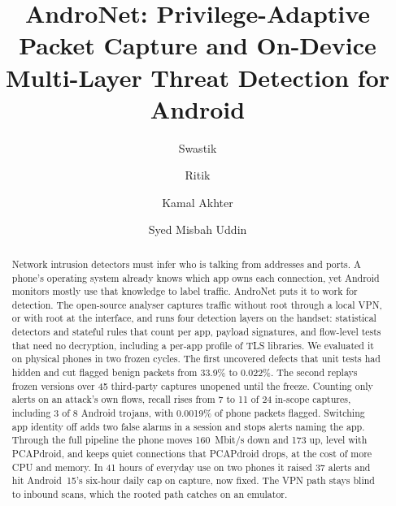 \documentclass[runningheads]{llncs}
\newcommand{\Envelope}{\ding{41}}
\begin{document}
\title{AndroNet: Privilege-Adaptive Packet Capture and On-Device Multi-Layer Threat Detection for Android}

\author{Swastik\Envelope \and
Ritik \and
Kamal Akhter \and
Syed Misbah Uddin}


\maketitle

\begin{abstract}
Network intrusion detectors must infer who is talking from addresses and ports. A phone's operating system already knows which app owns each connection, yet Android monitors mostly use that knowledge to label traffic. AndroNet puts it to work for detection. The open-source analyser captures traffic without root through a local VPN, or with root at the interface, and runs four detection layers on the handset: statistical detectors and stateful rules that count per app, payload signatures, and flow-level tests that need no decryption, including a per-app profile of TLS libraries. We evaluated it on physical phones in two frozen cycles. The first uncovered defects that unit tests had hidden and cut flagged benign packets from 33.9\% to 0.022\%. The second replays frozen versions over 45 third-party captures unopened until the freeze. Counting only alerts on an attack's own flows, recall rises from 7 to 11 of 24 in-scope captures, including 3 of 8 Android trojans, with 0.0019\% of phone packets flagged. Switching app identity off adds two false alarms in a session and stops alerts naming the app. Through the full pipeline the phone moves 160~Mbit/s down and 173 up, level with PCAPdroid, and keeps quiet connections that PCAPdroid drops, at the cost of more CPU and memory. In 41 hours of everyday use on two phones it raised 37 alerts and hit Android~15's six-hour daily cap on capture, now fixed. The VPN path stays blind to inbound scans, which the rooted path catches on an emulator.

\end{abstract}
\end{document}
